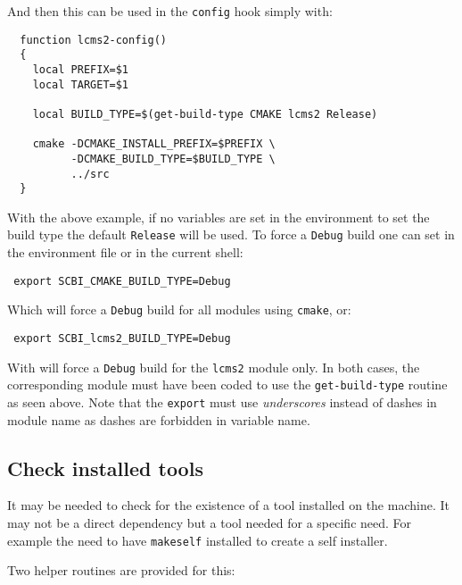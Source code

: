 \documentclass[a4paper,12pt,twoside]{article}
\newcommand{\code}[1]{\texttt{#1}}
\renewcommand{\emph}[1]{\textit{#1}}
\begin{document}
And then this can be used in the \code{config} hook simply with:

\begin{lstlisting}
  function lcms2-config()
  {
    local PREFIX=$1
    local TARGET=$1

    local BUILD_TYPE=$(get-build-type CMAKE lcms2 Release)

    cmake -DCMAKE_INSTALL_PREFIX=$PREFIX \
          -DCMAKE_BUILD_TYPE=$BUILD_TYPE \
          ../src
  }
\end{lstlisting}

With the above example, if no variables are set in the environment to set the build type the default \code{Release} will be used. To force a \code{Debug} build one can set in the environment file or in the current shell:

\begin{lstlisting}
 export SCBI_CMAKE_BUILD_TYPE=Debug
\end{lstlisting}

Which will force a \code{Debug} build for all modules using \code{cmake}, or:

\begin{lstlisting}
 export SCBI_lcms2_BUILD_TYPE=Debug
\end{lstlisting}

With will force a \code{Debug} build for the \code{lcms2} module only. In both cases, the corresponding module must have been coded to use the \code{get-build-type} routine as seen above. Note that the \code{export} must use \emph{underscores} instead of dashes in module name as dashes are forbidden in variable name.

\subsection{Check installed tools}

It may be needed to check for the existence of a tool installed on the machine. It may not be a direct dependency but a tool needed for a specific need. For example the need to have \code{makeself} installed to create a self installer.

Two helper routines are provided for this:
\end{document}
